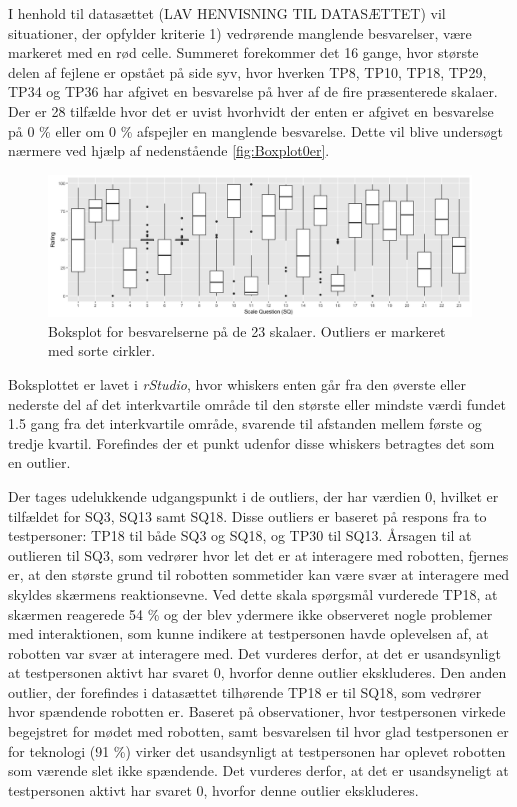I henhold til datasættet (LAV HENVISNING TIL DATASÆTTET) vil situationer, der opfylder kriterie 1) vedrørende manglende besvarelser, være markeret med en rød celle. Summeret forekommer det 16 gange, hvor største delen af fejlene er opstået på side syv, hvor hverken TP8, TP10, TP18, TP29, TP34 og TP36 har afgivet en besvarelse på hver af de fire præsenterede skalaer. \blankline
%
Der er 28 tilfælde hvor det er uvist hvorhvidt der enten er afgivet en besvarelse på 0 \% eller om 0 \% afspejler en manglende besvarelse. Dette vil blive undersøgt nærmere ved hjælp af nedenstående \autoref{fig:Boxplot0er}.
%
\begin{figure}[H]
\centering
\includegraphics[width = \textwidth]{Figure/DatabehandlingSkalaer/Boksplot0er} 
\caption{Boksplot for besvarelserne på de 23 skalaer. Outliers er markeret med sorte cirkler.}
\label{fig:Boxplot0er}
\end{figure}
\noindent
%
Boksplottet er lavet i \textit{rStudio}, hvor whiskers enten går fra den øverste eller nederste del af det interkvartile område til den største eller mindste værdi fundet 1.5 gang fra det interkvartile område, svarende til afstanden mellem første og tredje kvartil. Forefindes der et punkt udenfor disse whiskers betragtes det som en outlier.

Der tages udelukkende udgangspunkt i de outliers, der har værdien 0, hvilket er tilfældet for SQ3, SQ13 samt SQ18. Disse outliers er baseret på respons fra to testpersoner: TP18 til både SQ3 og SQ18, og TP30 til SQ13. Årsagen til at outlieren til SQ3, som vedrører hvor let det er at interagere med robotten, fjernes er, at den største grund til robotten sommetider kan være svær at interagere med skyldes skærmens reaktionsevne. Ved dette skala spørgsmål vurderede TP18, at skærmen reagerede 54 \% og der blev ydermere ikke observeret nogle problemer med interaktionen, som kunne indikere at testpersonen havde oplevelsen af, at robotten var svær at interagere med. Det vurderes derfor, at det er usandsynligt at testpersonen aktivt har svaret 0, hvorfor denne outlier ekskluderes. Den anden outlier, der forefindes i datasættet tilhørende TP18 er til SQ18, som vedrører hvor spændende robotten er. Baseret på observationer, hvor testpersonen virkede begejstret for mødet med robotten, samt besvarelsen til hvor glad testpersonen er for teknologi (91 \%) virker det usandsynligt at testpersonen har oplevet robotten som værende slet ikke spændende. Det vurderes derfor, at det er usandsyneligt at testpersonen aktivt har svaret 0, hvorfor denne outlier ekskluderes.

